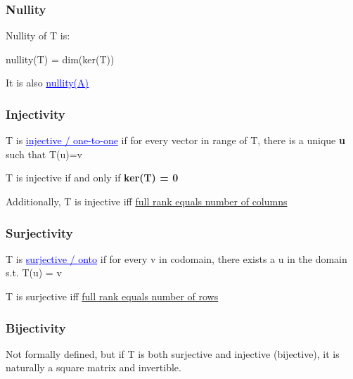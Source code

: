 \documentclass{article}
\newcommand{\bul}[1]{\textcolor{blue}{\underline{#1}}}
\newcommand{\sbreak}{\vspace{10pt}}
\begin{document}
\subsubsection{Nullity}
Nullity of T is:
\begin{center}
    nullity(T) = dim(ker(T))
\end{center}
It is also \bul{nullity(A)}

\subsubsection{Injectivity}
T is \bul{injective / one-to-one} if for every vector in range of T, there is a unique \textbf{u} such that T(u)=v

\sbreak

T is injective if and only if \textbf{ker(T) = {0}}

\sbreak

Additionally, T is injective iff \hyperref[sec:eswfrenoc]{full rank equals number of columns}


\subsubsection{Surjectivity}
T is \bul{surjective / onto} if for every v in codomain, there exists a u in the domain s.t. T(u) = v

\sbreak

T is surjective iff \hyperref[sec:eswfrenor]{full rank equals number of rows}

\subsubsection{Bijectivity}
Not formally defined, but if T is both surjective and injective (bijective), it is naturally a square matrix and invertible.
\end{document}

